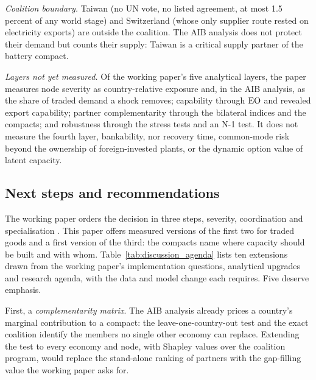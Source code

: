 \emph{Coalition boundary.} Taiwan (no UN vote, no listed agreement, at most 1.5 percent of any
world stage) and Switzerland (whose only supplier route rested on electricity exports) are outside
the coalition. The AIB analysis does not protect their demand but counts their supply: Taiwan is a
critical supply partner of the battery compact.

\emph{Layers not yet measured.} Of the working paper's five analytical layers, the paper measures
node severity as country-relative exposure and, in the AIB analysis, as the share of traded demand a
shock removes; capability through $\mathrm{EO}$ and revealed export capability; partner complementarity
through the bilateral indices and the compacts; and robustness through the stress tests and an N-1
test. It does not measure the fourth layer, bankability, nor recovery time, common-mode risk beyond
the ownership of foreign-invested plants, or the dynamic option value of latent capacity.

\subsection{Next steps and recommendations}\label{subsec:discussion_next}

The working paper orders the decision in three steps, severity, coordination and specialisation
\citep{neis2026allied}. This paper offers measured versions of the first two for traded goods and a
first version of the third: the compacts name where capacity should be built and with whom.
Table~\ref{tab:discussion_agenda} lists ten extensions drawn from the working paper's
implementation questions, analytical upgrades and research agenda, with the data and model change
each requires. Five deserve emphasis.

First, a \emph{complementarity matrix}. The AIB analysis already prices a country's marginal
contribution to a compact: the leave-one-country-out test and the exact coalition identify the
members no single other economy can replace. Extending the test to every economy and node, with
Shapley values over the coalition program, would replace the stand-alone ranking of partners with the
gap-filling value the working paper asks for.

